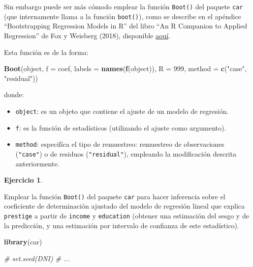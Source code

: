 \documentclass[
]{book}
\newenvironment{Shaded}{\begin{snugshade}}{\end{snugshade}}
\newcommand{\CommentTok}[1]{\textcolor[rgb]{0.56,0.35,0.01}{\textit{#1}}}
\newcommand{\DataTypeTok}[1]{\textcolor[rgb]{0.13,0.29,0.53}{#1}}
\newcommand{\DecValTok}[1]{\textcolor[rgb]{0.00,0.00,0.81}{#1}}
\newcommand{\KeywordTok}[1]{\textcolor[rgb]{0.13,0.29,0.53}{\textbf{#1}}}
\newcommand{\NormalTok}[1]{#1}
\newcommand{\StringTok}[1]{\textcolor[rgb]{0.31,0.60,0.02}{#1}}
\theoremstyle{break}
\theoremstyle{definition}
\theoremstyle{definition}
\theoremstyle{definition}
\newtheorem{exercise}{Ejercicio}[chapter]
\theoremstyle{remark}
\begin{document}
Sin embargo puede ser más cómodo emplear la función \texttt{Boot()} del paquete \texttt{car} (que internamente llama a la función \texttt{boot()}),
como se describe en el apéndice ``Bootstrapping Regression Models in R'' del libro ``An R Companion to Applied Regression'' de Fox y Weisberg (2018), disponible \href{https://socialsciences.mcmaster.ca/jfox/Books/Companion/appendices/Appendix-Bootstrapping.pdf}{aquí}.

Esta función es de la forma:

\begin{Shaded}
\begin{Highlighting}[]
\KeywordTok{Boot}\NormalTok{(object, }\DataTypeTok{f =}\NormalTok{ coef, }\DataTypeTok{labels =} \KeywordTok{names}\NormalTok{(}\KeywordTok{f}\NormalTok{(object)), }\DataTypeTok{R =} \DecValTok{999}\NormalTok{, }
     \DataTypeTok{method =} \KeywordTok{c}\NormalTok{(}\StringTok{"case"}\NormalTok{, }\StringTok{"residual"}\NormalTok{))}
\end{Highlighting}
\end{Shaded}

donde:

\begin{itemize}
\item
  \texttt{object}: es un objeto que contiene el ajuste de un modelo de regresión.
\item
  \texttt{f}: es la función de estadísticos (utilizando el ajuste como argumento).
\item
  \texttt{method}: especifíca el tipo de remuestreo: remuestreo de observaciones (\texttt{"case"})
  o de residuos (\texttt{"residual"}), empleando la modificación descrita anteriormente.
\end{itemize}

\begin{exercise}
\protect\hypertarget{exr:boot-car}{}{\label{exr:boot-car} }
\end{exercise}
Emplear la función \texttt{Boot()} del paquete \texttt{car} para hacer inferencia sobre
el coeficiente de determinación ajustado del modelo de regresión lineal
que explica \texttt{prestige} a partir de \texttt{income} y \texttt{education}
(obtener una estimación del sesgo y de la predicción,
y una estimación por intervalo de confianza de este estadístico).

\begin{Shaded}
\begin{Highlighting}[]
\KeywordTok{library}\NormalTok{(car)}

\CommentTok{# set.seed(DNI)}
\CommentTok{# ...}
\end{Highlighting}
\end{Shaded}
\end{document}
